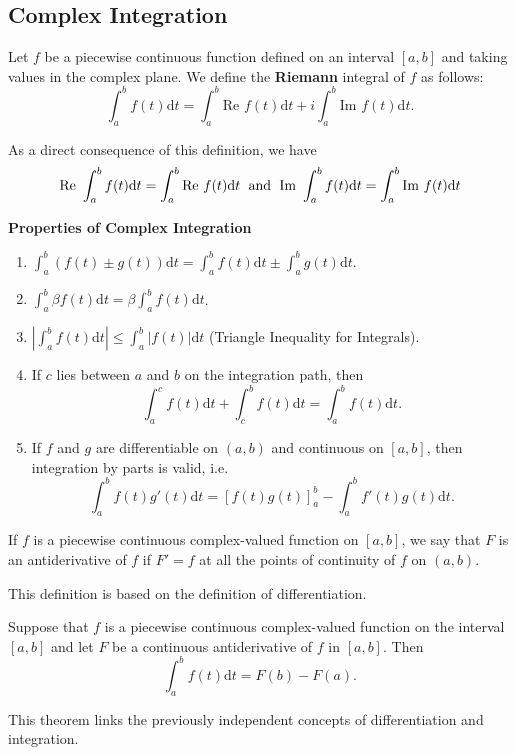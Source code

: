 \subsection{Complex Integration}
\begin{defn}
Let $f$ be a piecewise continuous function defined on an interval
$[a,b]$ and taking values in the complex plane. We define the \textbf{Riemann} integral of $f$
as follows:
$$\int_a^b f(t) \mathrm{d}t = \int_a^b\mbox{Re }f(t)\mathrm{d}t + i \int_a^b\mbox{Im }f(t)\mathrm{d}t.$$
\end{defn}
As a direct consequence of this definition, we have
$$\mbox{Re }\int_a^b f(t) \mathrm{d}t = \int_a^b\mbox{Re }f(t)\mathrm{d}t \hspace{0.5pc} \mbox{and} \hspace{0.5pc} \mbox{Im }\int_a^b f(t) \mathrm{d}t = \int_a^b\mbox{Im }f(t)\mathrm{d}t$$

\medskip

\textbf{Properties of Complex Integration}
\begin{enumerate}
    \item $\displaystyle\int_a^b (f(t) \pm g(t)) \mathrm{d}t = \int_a^b f(t) \mathrm{d}t \pm \int_a^b g(t) \mathrm{d}t$.
    \item $\displaystyle\int_a^b \beta f(t) \mathrm{d}t = \beta\int_a^b f(t) \mathrm{d}t$.
    \item $\displaystyle\left|\int_a^b f(t) \mathrm{d}t\right| \leq \int_a^b |f(t)| \mathrm{d}t$ (Triangle Inequality for Integrals).
	\item If $c$ lies between $a$ and $b$ on the integration path, then $$\int_a^c f(t) \mathrm{d}t + \int_c^b f(t) \mathrm{d}t = \int_a^b f(t) \mathrm{d}t.$$
    \item If $f$ and $g$ are differentiable on $(a,b)$ and continuous on $[a,b]$, then integration by parts is valid, i.e. $$\int_a^b f(t)g'(t)\mathrm{d}t = \left[ f(t)g(t)\right]_a^b - \int_a^b f'(t)g(t)\mathrm{d}t.$$
\end{enumerate}

\begin{defn}[Antiderivative]
If $f$ is a piecewise continuous complex-valued function on $[a,b]$,
we say that $F$ is an antiderivative of $f$ if $F' = f$ at all the points of continuity of $f$ on $(a,b)$.
\end{defn}
This definition is based on the definition of differentiation.

\begin{thm}
Suppose that $f$ is a piecewise
continuous complex-valued function on the interval $[a, b]$ and let $F$ be a continuous antiderivative of $f$ in $[a, b]$. Then
$$\int_a^b f(t) \mathrm{d}t = F(b) - F(a).$$
\end{thm}
This theorem links the previously independent concepts of differentiation and integration.

